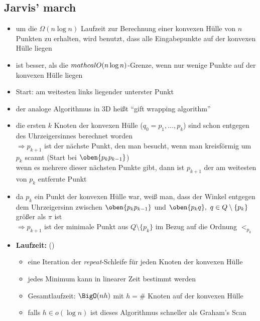 \subsection{Jarvis' march}
\begin{itemize}[itemsep=0pt]
	\item um die $\Omega(n\log n)$ Laufzeit zur Berechnung einer konvexen Hülle von $n$ Punkten zu erhalten, wird benutzt, dass alle Eingabepunkte auf der konvexen Hülle liegen
	\item ist besser, als die $\\mathcal{O}(n\log n)$-Grenze, wenn nur wenige Punkte auf der konvexen Hülle liegen
	\item Start: am weitesten links liegender unterster Punkt
	\item der analoge Algorithmus in 3D heißt ``gift wrapping algorithm''
	\item die ersten $k$ Knoten der konvexen Hülle ($q_0=p_1,\dots,p_k$) sind schon entgegen des Uhrzeigersinnes berechnet worden\\
	$\Rightarrow p_{k+1}$ ist der nächste Punkt, den man besucht, wenn man kreisförmig um $p_k$ scannt (Start bei $\oben{p_kp_{k-1}}$)\\
	wenn es mehrere dieser nächsten Punkte gibt, dann ist $p_{k+1}$ der am weitesten von $p_k$ entfernte Punkt
	\item da $p_k$ ein Punkt der konvexen Hülle war, weiß man, dass der Winkel entgegen dem Uhrzeigersinn zwischen $\oben{p_kp_{k-1}}$ und $\oben{p_kq},~q\in Q\setminus \{p_k\}$ größer als $\pi$ ist\\
	$\Rightarrow p_{k+1}$ ist der minimale Punkt aus $Q\setminus \{p_k\}$ im Bezug auf die Ordnung $<_{p_k}$
	\item \textbf{Laufzeit:} ()
		\begin{itemize}
			\item eine Iteration der \textit{repeat}-Schleife für jeden Knoten der konvexen Hülle
			\item jedes Minimum kann in linearer Zeit bestimmt werden
			\item Gesamtlaufzeit: $\BigO(nh)$ mit $h = \#$ Knoten auf der konvexen Hülle
			\item falls $h\in o(\log n)$ ist dieses Algorithmus schneller als Graham's Scan
		\end{itemize}
\end{itemize}